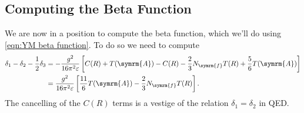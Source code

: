 \documentclass[fleqn]{NotesClass}
\newcommand{\adjointRep}{\symrm{A}}
\newcommand{\numberFermions}{N_{\symrm{f}}}
\begin{document}
    \subsection{Computing the Beta Function}
    We are now in a position to compute the beta function, which we'll do using \cref{eqn:YM beta function}.
    To do so we need to compute
    \begin{align}
        \delta_1 - \delta_2 - \frac{1}{2}\delta_3 &= -\frac{g^2}{16\pi^2\varepsilon}\left[ C(R) + T(\adjointRep) - C(R) - \frac{2}{3}\numberFermions T(R) + \frac{5}{6}T(\adjointRep) \right]\\
        &= \frac{g^2}{16\pi^2\varepsilon}\left[ \frac{11}{6}T(\adjointRep) - \frac{2}{3}\numberFermions T(R) \right].
    \end{align}
    The cancelling of the \(C(R)\) terms is a vestige of the relation \(\delta_1 = \delta_2\) in QED.
    
\end{document}
